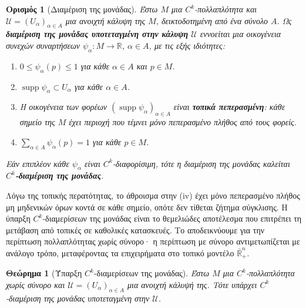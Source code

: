 \documentclass[11pt,a4paper,twoside,openright]{book}
\newtheorem{theorem}[lemma]{Θεώρημα}
\newtheorem{definition}[lemma]{Ορισμός}
\begin{document}
\begin{definition}[Διαμέριση της μονάδας]\label{def:partition-of-unity}
Έστω $M$ μια $C^k$-πολλαπλότητα και $\mathcal{U} = (U_\alpha)_{\alpha \in A}$ μια ανοιχτή κάλυψη της $M$, δεικτοδοτημένη από ένα σύνολο $A$. Ως \textbf{διαμέριση της μονάδας υποτεταγμένη στην κάλυψη} $\mathcal{U}$ εννοείται μια οικογένεια συνεχών συναρτήσεων $\psi_\alpha: M \to \mathbb{R}$, $\alpha \in A$, με τις εξής ιδιότητες:
\begin{enumerate}[label=(\roman*), leftmargin=0pt, itemindent=*, align=left]
    \item[\textup{(i)}]
    	$0 \le \psi_\alpha(p) \le 1$ για κάθε $\alpha \in A$ και $p \in M$.
    \item[\textup{(ii)}]
    	$\operatorname{supp} \psi_\alpha \subset U_\alpha$ για κάθε $\alpha \in A$.
    \item[\textup{(iii)}]
    	Η οικογένεια των φορέων $(\operatorname{supp} \psi_\alpha)_{\alpha \in A}$ είναι \textbf{τοπικά πεπερασμένη}: κάθε σημείο της $M$ έχει περιοχή που τέμνει μόνο πεπερασμένο πλήθος από τους φορείς.
    \item[\textup{(iv)}]
    	$\sum_{\alpha \in A} \psi_\alpha(p) = 1$ για κάθε $p \in M$.
\end{enumerate}
Εάν επιπλέον κάθε $\psi_\alpha$ είναι $C^k$-διαφορίσιμη, τότε η διαμέριση της μονάδας καλείται \textbf{$C^k$-διαμέριση της μονάδας}.
\end{definition}

\noindent
Λόγω της τοπικής περατότητας, το άθροισμα στην (iv) έχει μόνο πεπερασμένο πλήθος μη μηδενικών όρων κοντά σε κάθε σημείο, οπότε δεν τίθεται ζήτημα σύγκλισης. Η ύπαρξη $C^k$-διαμερίσεων της μονάδας είναι το θεμελιώδες αποτέλεσμα που επιτρέπει τη μετάβαση από τοπικές σε καθολικές κατασκευές. Το αποδεικνύουμε για την περίπτωση πολλαπλότητας χωρίς σύνορο· η περίπτωση με σύνορο αντιμετωπίζεται με ανάλογο τρόπο, μεταφέροντας τα επιχειρήματα στο τοπικό μοντέλο $\bar{\mathbb{R}}^n_+$.

\begin{theorem}[Ύπαρξη $C^k$-διαμερίσεων της μονάδας]\label{theorem:existence-partition-of-unity}
Έστω $M$ μια $C^k$-πολλαπλότητα χωρίς σύνορο και $\mathcal{U} = (U_\alpha)_{\alpha \in A}$ μια ανοιχτή κάλυψή της. Τότε υπάρχει $C^k$-διαμέριση της μονάδας υποτεταγμένη στην $\mathcal{U}$.
\end{theorem}
\end{document}
